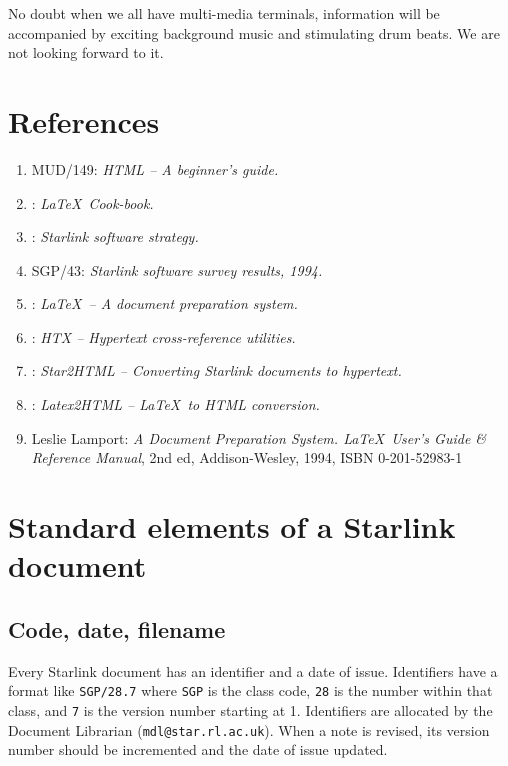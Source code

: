 No doubt when we all have multi-media terminals, information will be
accompanied by exciting background music and stimulating drum beats.
We are not looking forward to it.

\section{References}

\begin{enumerate}
\item MUD/149: {\em HTML -- A beginner's guide.}
\item {}: {\em \LaTeX\ Cook-book.}
\item {}: {\em Starlink software strategy.}
\item SGP/43: {\em Starlink software survey results, 1994.}
\item {}: {\em \LaTeX\ -- A document preparation system.}
\item {}: {\em HTX -- Hypertext cross-reference utilities.}
\item {}: {\em Star2HTML -- Converting Starlink documents
  to hypertext.}
\item {}: {\em Latex2HTML -- \LaTeX\ to HTML conversion.}
\item Leslie Lamport: {\em A Document Preparation System. \LaTeX\ User's
Guide \& Reference Manual}, 2nd ed, Addison-Wesley, 1994,
ISBN 0-201-52983-1
\end{enumerate}

\appendix

\newpage

\section{Standard elements of a Starlink document}

\subsection{Code, date, filename}

Every Starlink document has an identifier and a date of issue.
Identifiers have a format like {\tt SGP/28.7} where {\tt SGP} is the class code,
{\tt 28} is the number within that class, and {\tt 7} is the version number
starting at 1.
Identifiers are allocated by the Document Librarian 
({\tt mdl@star.rl.ac.uk}).
When a note is revised, its version number should be incremented and the
date of issue updated.

